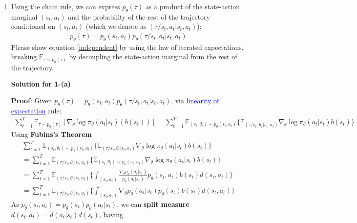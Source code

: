 \documentclass[12pt]{article}
\begin{document}
\begin{enumerate} [label=(\alph*)]
\item Using the chain rule, we can express $p_\theta(\tau)$ as a product of the state-action marginal $(s_t, a_t)$ and the probability of the rest of the trajectory conditioned on $(s_t, a_t)$ (which we denote as $(\tau / s_t, a_t | s_t, a_t)$):
    \begin{align*}
        p_\theta(\tau) = p_\theta(s_t, a_t)p_\theta(\tau / s_t, a_t | s_t, a_t)
    \end{align*}
    Please show equation \ref{independent} by using the law of iterated expectations, breaking $\mathbb{E}_{\tau \sim p_\theta(\tau)}$ by decoupling the state-action marginal from the rest of the trajectory.

\begin{center}
	\textbf{Solution for 1-(a)}
\end{center}
\textbf{Proof}: Given $p_\theta(\tau) = p_\theta(s_t, a_t)p_\theta(\tau / s_t, a_t | s_t, a_t)$, via \href{https://brilliant.org/wiki/linearity-of-expectation/}{\textcolor{blue}{linearity of expectation}}  rule:
\begin{align*}
	\sum_{t=1}^T \mathbb{E}_{\tau \sim p_\theta(\tau)}\left[ \nabla_\theta \log \pi_\theta(a_t|s_t) \left(b(s_t)\right)\right] = \sum_{t=1}^T \mathbb{E}_{(s_t, \theta_t) \sim p_{\theta}(s_t, a_t)}\lbrace \mathbb{E}_{(\tau / s_t, \theta_t| s_t, a_t)} \nabla_\theta \log \pi_\theta(a_t|s_t) b(s_t) \rbrace
\end{align*}
Using \textbf{Fubins's Theorem}
\begin{multline}
	\sum_{t=1}^T \mathbb{E}_{(s_t, \theta_t) \sim p_{\theta}(s_t, a_t)}\lbrace \mathbb{E}_{(\tau / s_t, \theta_t| s_t, a_t)} \nabla_\theta \log \pi_\theta(a_t|s_t) b(s_t) \rbrace \\
	= \sum_{t=1}^T \mathbb{E}_{(\tau / s_t, \theta_t| s_t, a_t)} \lbrace \mathbb{E}_{(s_t, \theta_t) \sim p_{\theta}(s_t, a_t)} \nabla_\theta \log \pi_\theta(a_t|s_t) b(s_t) \rbrace \\
	=  \sum_{t=1}^T \mathbb{E}_{(\tau / s_t, \theta_t| s_t, a_t)} \lbrace \int_{(s_t,a_t)} \frac{\nabla_\theta p_{\theta} (a_t|s_t)}{p_{\theta}(a_t | s_t)} p_{\theta}(s_t, a_t) b(s_t) d(s_t, a_t)\rbrace \\
	= \sum_{t=1}^T \mathbb{E}_{(\tau / s_t, \theta_t| s_t, a_t)} \lbrace \int_{(s_t,a_t)} \nabla_\theta p_{\theta} (a_t|s_t) p_{\theta}(s_t) b(s_t) d(s_t, a_t)\rbrace
\end{multline}
As $p_{\theta}(s_t, a_t) = p_{\theta}(s_t) p_{\theta}(a_t|s_t)$, we can \textbf{split measure} $d(s_t, a_t) = d(a_t|s_t) d(s_t)$,  having

\end{enumerate}
\end{document}
